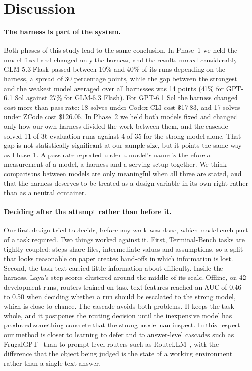 \section{Discussion}
\label{sec:discussion}

\paragraph{The harness is part of the system.}
Both phases of this study lead to the same conclusion. In Phase~1 we held the model fixed and changed only the
harness, and the results moved considerably. GLM-5.3 Flash passed between 10\% and 40\% of its runs depending on
the harness, a spread of 30 percentage points, while the gap between the strongest and the weakest model
averaged over all harnesses was 14 points (41\% for GPT-6.1 Sol against 27\% for GLM-5.3 Flash). For GPT-6.1 Sol
the harness changed cost more than pass rate: 18 solves under Codex CLI cost \$17.83, and 17 solves under ZCode
cost \$126.05. In Phase~2 we held both models fixed and changed only how our own harness divided the work between
them, and the cascade solved 11 of 36 evaluation runs against 4 of 35 for the strong model alone. That gap is
not statistically significant at our sample size, but it points the same way as Phase~1. A pass rate reported under a model's name is therefore a
measurement of a model, a harness and a serving setup together. We think comparisons between models are only
meaningful when all three are stated, and that the harness deserves to be treated as a design variable in its
own right rather than as a neutral container.

\paragraph{Deciding after the attempt rather than before it.}
Our first design tried to decide, before any work was done, which model each part of a task required. Two
things worked against it. First, Terminal-Bench tasks are tightly coupled: steps share files, intermediate
values and assumptions, so a split that looks reasonable on paper creates hand-offs in which information is
lost. Second, the task text carried little information about difficulty. Inside the harness, Laya's step scores
clustered around the middle of its scale. Offline, on 42 development runs, routers trained on task-text
features reached an AUC of 0.46 to 0.50 when deciding whether a run should be escalated to the strong model,
which is close to chance. The cascade
avoids both problems. It keeps the task whole, and it postpones the routing decision until the inexpensive model
has produced something concrete that the strong model can inspect. In this respect our method is closer to
learning to defer and to answer-level cascades such as FrugalGPT~\cite{chen2023frugalgpt} than to prompt-level
routers such as RouteLLM~\cite{ong2024routellm}, with the difference that the object being judged is the state of a working environment rather than a
single text answer.

